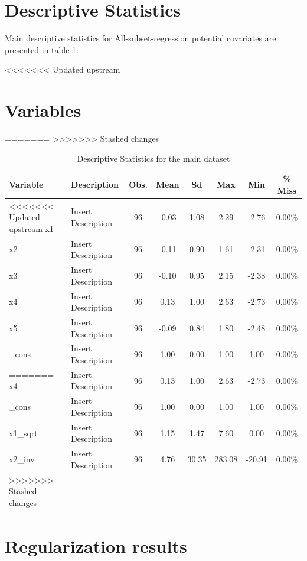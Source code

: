 \documentclass{article}
\begin{document}
\section{Descriptive Statistics}

Main descriptive statistics for All-subset-regression potential covariates are presented in table 1:

\clearpage

<<<<<<< Updated upstream
\section{Variables}

=======
>>>>>>> Stashed changes
\begin{table}[!h]
  \centering
  \caption{Descriptive Statistics for the main dataset}
    \begin{tabular}{|p{2cm}|p{4cm}|c|c|c|c|c|c|}
    \hline
    Variable & Description & Obs. & Mean & Sd & Max & Min & \% Miss \\
    \hline
    \hline
<<<<<<< Updated upstream
    x1 & Insert Description & 96 & -0.03 & 1.08 & 2.29 & -2.76 & 0.00\% \\ 
    x2 & Insert Description & 96 & -0.11 & 0.90 & 1.61 & -2.31 & 0.00\% \\ 
    x3 & Insert Description & 96 & -0.10 & 0.95 & 2.15 & -2.38 & 0.00\% \\ 
    x4 & Insert Description & 96 & 0.13 & 1.00 & 2.63 & -2.73 & 0.00\% \\ 
    x5 & Insert Description & 96 & -0.09 & 0.84 & 1.80 & -2.48 & 0.00\% \\ 
    _cons & Insert Description & 96 & 1.00 & 0.00 & 1.00 & 1.00 & 0.00\% \\ 
=======
    x4 & Insert Description & 96 & 0.13 & 1.00 & 2.63 & -2.73 & 0.00\% \\ 
    \_cons & Insert Description & 96 & 1.00 & 0.00 & 1.00 & 1.00 & 0.00\% \\ 
    x1\_sqrt & Insert Description & 96 & 1.15 & 1.47 & 7.60 & 0.00 & 0.00\% \\ 
    x2\_inv & Insert Description & 96 & 4.76 & 30.35 & 283.08 & -20.91 & 0.00\% \\ 
>>>>>>> Stashed changes
    \hline
    \end{tabular}
\end{table}

\section{Regularization results}
\end{document}
